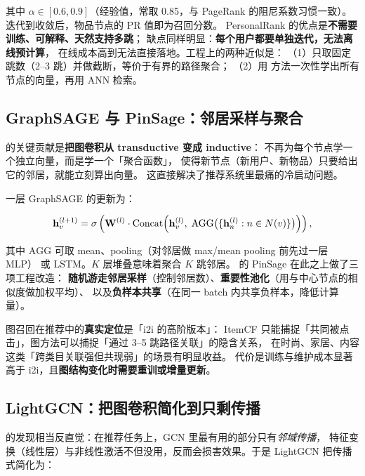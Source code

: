 其中 $\alpha \in [0.6, 0.9]$（经验值，常取 0.85，与 PageRank 的阻尼系数习惯一致）。
迭代到收敛后，物品节点的 $\mathrm{PR}$ 值即为召回分数。
PersonalRank 的优点是\textbf{不需要训练、可解释、天然支持多跳}；
缺点同样明显：\textbf{每个用户都要单独迭代，无法离线预计算}，
在线成本高到无法直接落地。工程上的两种近似是：
（1）只取固定跳数（2--3 跳）并做截断，等价于有界的路径聚合；
（2）用 方法一次性学出所有节点的向量，再用 ANN 检索。

\subsection{GraphSAGE 与 PinSage：邻居采样与聚合}

\cite{hamilton2017graphsage} 的关键贡献是\textbf{把图卷积从 transductive 变成 inductive}：
不再为每个节点学一个独立向量，而是学一个「聚合函数」，
使得新节点（新用户、新物品）只要给出它的邻居，就能立刻算出向量。
这直接解决了推荐系统里最痛的冷启动问题。

一层 GraphSAGE 的更新为：

\begin{equation}
\mathbf{h}_v^{(l+1)} = \sigma \left(
\mathbf{W}^{(l)} \cdot \operatorname{Concat}\!\Big( \mathbf{h}_v^{(l)}, \; \mathrm{AGG}\big( \{ \mathbf{h}_n^{(l)} : n \in N(v) \} \big) \Big)
\right) ,
\label{eq:graphsage}
\end{equation}

其中 $\mathrm{AGG}$ 可取 mean、pooling（对邻居做 max/mean pooling 前先过一层 MLP）
或 LSTM。$K$ 层堆叠意味着聚合 $K$ 跳邻居。
\cite{ying2018pinsage} 的 PinSage 在此之上做了三项工程改造：
\textbf{随机游走邻居采样}（控制邻居数）、\textbf{重要性池化}（用与中心节点的相似度做加权平均）、
以及\textbf{负样本共享}（在同一 batch 内共享负样本，降低计算量）。

图召回在推荐中的\textbf{真实定位}是「i2i 的高阶版本」：
ItemCF 只能捕捉「共同被点击」，图方法可以捕捉「通过 3--5 跳路径关联」的隐含关系，
在时尚、家居、内容这类「跨类目关联强但共现弱」的场景有明显收益。
代价是训练与维护成本显著高于 i2i，且\textbf{图结构变化时需要重训或增量更新}。

\subsection{LightGCN：把图卷积简化到只剩传播}

\cite{he2020lightgcn} 的发现相当反直觉：在推荐任务上，GCN 里最有用的部分只有\emph{邻域传播}，
特征变换（线性层）与非线性激活不但没用，反而会损害效果。于是 LightGCN 把传播式简化为：

